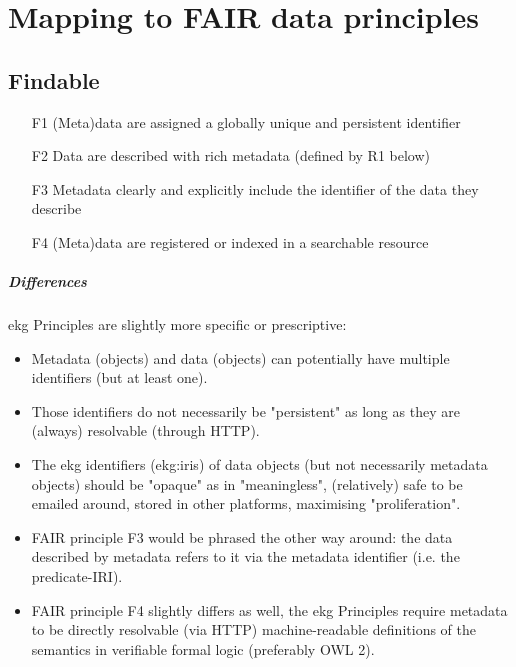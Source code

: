 \chapter{Mapping to FAIR data principles}\label{ch:ekg-mm-fair-data-principles}

\section{Findable}

\begin{itemize}
    \item[F1] (Meta)data are assigned a globally unique and persistent identifier
    \item[F2] Data are described with rich metadata (defined by R1 below)
    \item[F3] Metadata clearly and explicitly include the identifier of the data they describe
    \item[F4] (Meta)data are registered or indexed in a searchable resource
\end{itemize}

\paragraph{Differences}

\gls{ekg} Principles are slightly more specific or prescriptive:

\begin{itemize}
    \item Metadata (objects) and data (objects) can potentially have multiple identifiers (but at least one).
    \item Those identifiers do not necessarily be "persistent" as long as they are (always) resolvable (through HTTP).
    \item The \gls{ekg} identifiers (\glspl{ekg:iri}) of data objects (but not necessarily metadata objects) should be
          "opaque" as in "meaningless", (relatively) safe to be emailed around, stored in other platforms,
          maximising "proliferation".
    \item FAIR principle F3 would be phrased the other way around: the data described by metadata refers to it via
          the metadata identifier (i.e. the predicate-IRI).
    \item FAIR principle F4 slightly differs as well, the \gls{ekg} Principles require metadata to be directly
          resolvable (via HTTP) machine-readable definitions of the semantics in verifiable formal logic
          (preferably OWL 2).
\end{itemize}

